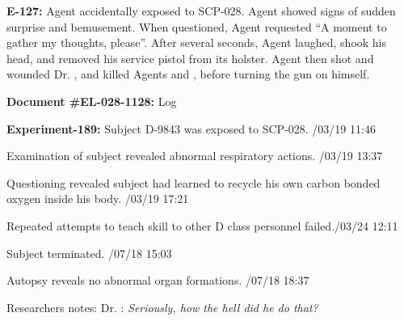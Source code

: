\textbf{E-127:} Agent  accidentally exposed to SCP-028. Agent showed signs of sudden surprise and bemusement. When questioned, Agent requested “A moment to gather my thoughts, please”. After several seconds, Agent laughed, shook his head, and removed his service pistol from its holster. Agent then shot and wounded Dr. , and killed Agents  and , before turning the gun on himself.

\textbf{Document \#EL-028-1128:} Log

\textbf{Experiment-189:} Subject D-9843 was exposed to SCP-028. /03/19 11:46

Examination of subject revealed abnormal respiratory actions. /03/19 13:37

Questioning revealed subject had learned to recycle his own carbon bonded oxygen inside his body. /03/19 17:21

Repeated attempts to teach skill to other D class personnel failed.\linebreak {}/03/24 12:11

Subject terminated. /07/18 15:03

Autopsy reveals no abnormal organ formations. /07/18 18:37

Researchers notes: Dr.  : \textsl{Seriously, how the hell did he do that?}